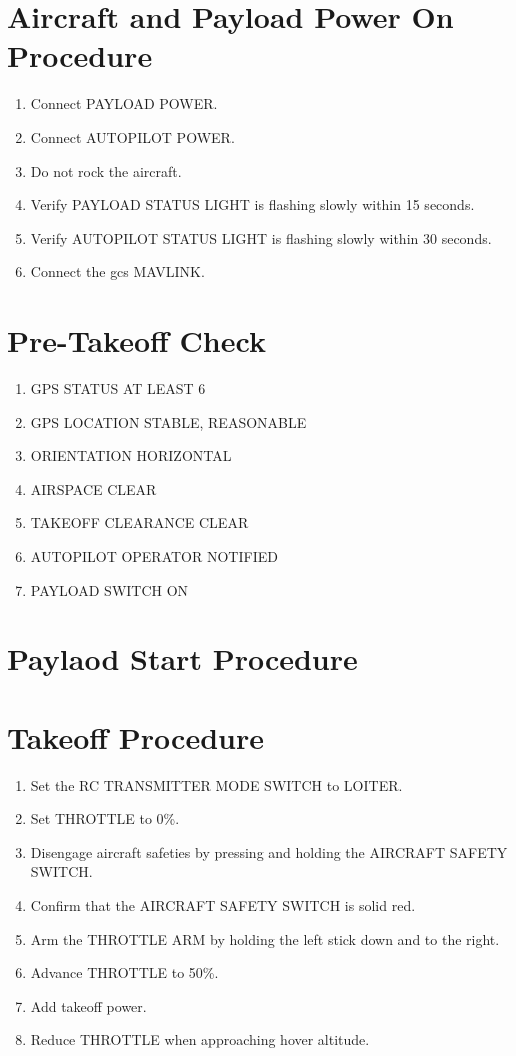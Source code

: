 \documentclass{report}
\begin{document}
	\section{Aircraft and Payload Power On Procedure}
		\begin{enumerate}
			\item Connect PAYLOAD POWER.
			\item Connect AUTOPILOT POWER.
			\item Do not rock the aircraft.
			\item Verify PAYLOAD STATUS LIGHT is flashing slowly within 15 seconds.
			\item Verify AUTOPILOT STATUS LIGHT is flashing slowly within 30 seconds.
			\item Connect the \gls{gcs} MAVLINK.
		\end{enumerate}
	\section{Pre-Takeoff Check}
		\begin{enumerate}
			\item GPS STATUS \hrulefill AT LEAST 6
			\item GPS LOCATION \hrulefill STABLE, REASONABLE
			\item ORIENTATION \hrulefill HORIZONTAL
			\item AIRSPACE \hrulefill CLEAR
			\item TAKEOFF CLEARANCE \hrulefill CLEAR
			\item AUTOPILOT OPERATOR \hrulefill NOTIFIED
			\item PAYLOAD SWITCH \hrulefill ON
		\end{enumerate}
	\section{Paylaod Start Procedure}
	\section{Takeoff Procedure}
		\begin{enumerate}
			\item Set the RC TRANSMITTER MODE SWITCH to LOITER.
			\item Set THROTTLE to 0\%.
			\item Disengage aircraft safeties by pressing and holding the AIRCRAFT SAFETY SWITCH.
			\item Confirm that the AIRCRAFT SAFETY SWITCH is solid red.
			\item Arm the THROTTLE ARM by holding the left stick down and to the right.
			\item Advance THROTTLE to 50\%.
			\item Add takeoff power.
			\item Reduce THROTTLE when approaching hover altitude.
		\end{enumerate}
\end{document}
